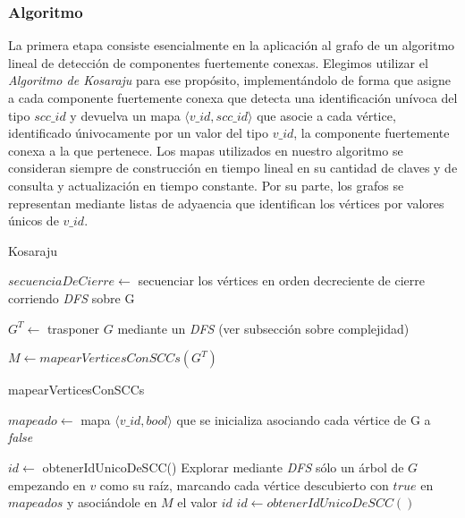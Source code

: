 \subsubsection{Algoritmo}

La primera etapa consiste esencialmente en la aplicación al grafo de un algoritmo lineal de detección de componentes fuertemente conexas. Elegimos utilizar el \textit{Algoritmo de Kosaraju} para ese propósito, implementándolo de forma que asigne a cada componente fuertemente conexa que detecta una identificación unívoca del tipo $scc\_id$ y devuelva un mapa $\langle v\_id, scc\_id \rangle$ que asocie a cada vértice, identificado únivocamente por un valor del tipo $v\_id$, la componente fuertemente conexa a la que pertenece. Los mapas utilizados en nuestro algoritmo se consideran siempre de construcción en tiempo lineal en su cantidad de claves y de consulta y actualización en tiempo constante. Por su parte, los grafos se representan mediante listas de adyaencia que identifican los vértices por valores únicos de $v\_id$.

\bigskip

\begin{algorithm}[H]
	\caption{Kosaraju}

    $\mathit{secuenciaDeCierre} \gets$ secuenciar los vértices en orden decreciente de cierre corriendo \textit{DFS} sobre G \;

    $\mathit{G^T} \gets$ trasponer $G$ mediante un \textit{DFS} (ver subsección sobre complejidad) \;

    $\mathit{M} \gets \mathit{mapearVerticesConSCCs(G^T)}$

\end{algorithm}

\bigskip

\begin{algorithm}[H]
    \caption{mapearVerticesConSCCs}

    $\mathit{mapeado} \gets$ mapa $\langle v\_id, bool \rangle$ que se inicializa asociando cada vértice de G a \textit{false}\;

    $id \gets$ obtenerIdUnicoDeSCC() \;
     {
         {
            Explorar mediante \textit{DFS} sólo un árbol de $G$ empezando en $v$ como su raíz, marcando cada vértice descubierto con $true$ en $mapeados$ y asociándole en $M$ el valor $id$ \;
            $id \gets obtenerIdUnicoDeSCC()$ \;
        }
    }

\end{algorithm}

